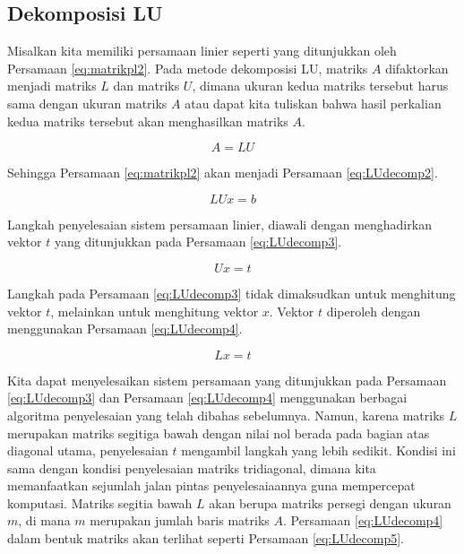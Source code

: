 \documentclass[
]{book}
\theoremstyle{definition}
\theoremstyle{definition}
\theoremstyle{definition}
\theoremstyle{definition}
\theoremstyle{remark}
\begin{document}
\hypertarget{ludecomp}{%
\subsection{Dekomposisi LU}\label{ludecomp}}

Misalkan kita memiliki persamaan linier seperti yang ditunjukkan oleh Persamaan \eqref{eq:matrikpl2}. Pada metode dekomposisi LU, matriks \(A\) difaktorkan menjadi matriks \(L\) dan matriks \(U\), dimana ukuran kedua matriks tersebut harus sama dengan ukuran matriks \(A\) atau dapat kita tuliskan bahwa hasil perkalian kedua matriks tersebut akan menghasilkan matriks \(A\).

\begin{equation}
A=LU
 \label{eq:LUdecomp}
\end{equation}

Sehingga Persamaan \eqref{eq:matrikpl2} akan menjadi Persamaan \eqref{eq:LUdecomp2}.

\begin{equation}
LUx=b
 \label{eq:LUdecomp2}
\end{equation}

Langkah penyelesaian sistem persamaan linier, diawali dengan menghadirkan vektor \(t\) yang ditunjukkan pada Persamaan \eqref{eq:LUdecomp3}.

\begin{equation}
Ux=t
 \label{eq:LUdecomp3}
\end{equation}

Langkah pada Persamaan \eqref{eq:LUdecomp3} tidak dimaksudkan untuk menghitung vektor \(t\), melainkan untuk menghitung vektor \(x\). Vektor \(t\) diperoleh dengan menggunakan Persamaan \eqref{eq:LUdecomp4}.

\begin{equation}
Lx=t
 \label{eq:LUdecomp4}
\end{equation}

Kita dapat menyelesaikan sistem persamaan yang ditunjukkan pada Persamaan \eqref{eq:LUdecomp3} dan Persamaan \eqref{eq:LUdecomp4} menggunakan berbagai algoritma penyelesaian yang telah dibahas sebelumnya. Namun, karena matriks \(L\) merupakan matriks segitiga bawah dengan nilai nol berada pada bagian atas diagonal utama, penyelesaian \(t\) mengambil langkah yang lebih sedikit. Kondisi ini sama dengan kondisi penyelesaian matriks tridiagonal, dimana kita memanfaatkan sejumlah jalan pintas penyelesaiaannya guna mempercepat komputasi. Matriks segitia bawah \(L\) akan berupa matriks persegi dengan ukuran \(m\), di mana \(m\) merupakan jumlah baris matriks \(A\). Persamaan \eqref{eq:LUdecomp4} dalam bentuk matriks akan terlihat seperti Persamaan \eqref{eq:LUdecomp5}.
\end{document}
